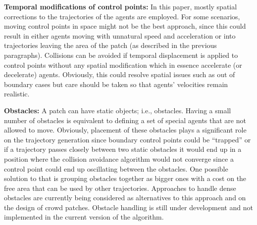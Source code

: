 \textbf{Temporal modifications of control points:}
In this paper, mostly spatial corrections to the trajectories of the agents are employed.
For some scenarios, moving control points in space might not be the best approach, since this could result in either agents moving with unnatural speed and acceleration or into trajectories leaving the area of the patch (as described in the previous paragraphs).
Collisions can be avoided if temporal displacement is applied to control points without any spatial modification which in essence accelerate (or decelerate) agents.
Obviously, this could resolve spatial issues such as out of boundary cases but care should be taken so that agents' velocities remain realistic.




\textbf{Obstacles:}
A patch can have static objects; i.e., obstacles.
Having a small number of obstacles is equivalent to defining a set of special agents that are not allowed to move.
Obviously, placement of these obstacles plays a significant role on the trajectory generation since boundary control points could be ``trapped'' or if a trajectory passes closely between two static obstacles it would end up in a position where the collision avoidance algorithm would not converge since a control point could end up oscillating between the obstacles.
One possible solution to that is grouping obstacles together as bigger ones with a cost on the free area that can be used by other trajectories.
Approaches to handle dense obstacles are currently being considered as alternatives to this approach and on the design of crowd patches.
Obstacle handling is still under development and not implemented in the current version of the algorithm.


